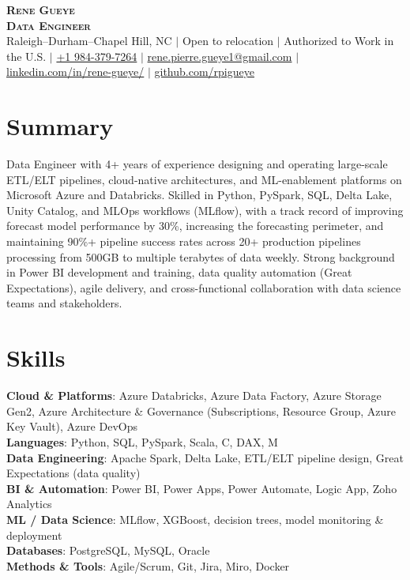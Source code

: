 \documentclass[letterpaper,11pt]{article}
\begin{document}
\begin{center}
    \textbf{\Huge \scshape Rene Gueye} \\ \vspace{3pt}
    \textbf{ \Large \scshape Data Engineer} \\ \vspace{3pt}
    \small
    Raleigh--Durham--Chapel Hill, NC $|$ Open to relocation $|$ Authorized to Work in the U.S. $|$
    \href{tel:+19843797264}{+1 984-379-7264} $|$
    \href{mailto:rene.pierre.gueye1@gmail.com}{rene.pierre.gueye1@gmail.com} $|$
    \href{https://linkedin.com/in/rene-gueye/}{linkedin.com/in/rene-gueye/} $|$
    \href{https://github.com/rpigueye}{github.com/rpigueye}
\end{center}

\section{Summary}
\small{Data Engineer with 4+ years of experience designing and operating large-scale ETL/ELT pipelines, cloud-native architectures, and ML-enablement platforms on Microsoft Azure and Databricks. Skilled in Python, PySpark, SQL, Delta Lake, Unity Catalog, and MLOps workflows (MLflow), with a track record of improving forecast model performance by 30\%, increasing the forecasting perimeter, and maintaining 90\%+ pipeline success rates across 20+ production pipelines processing from 500GB to multiple terabytes of data weekly. Strong background in Power BI development and training, data quality automation (Great Expectations), agile delivery, and cross-functional collaboration with data science teams and stakeholders.}

\section{Skills}
 \begin{itemize}[leftmargin=0.15in, label={}]
    \small{\item{
     \textbf{Cloud \& Platforms}{: Azure Databricks, Azure Data Factory, Azure Storage Gen2, Azure Architecture \& Governance (Subscriptions, Resource Group, Azure Key Vault), Azure DevOps} \\
     \textbf{Languages}{: Python, SQL, PySpark, Scala, C, DAX, M} \\
     \textbf{Data Engineering}{: Apache Spark, Delta Lake, ETL/ELT pipeline design, Great Expectations (data quality)} \\
     \textbf{BI \& Automation}{: Power BI, Power Apps, Power Automate, Logic App, Zoho Analytics} \\
     \textbf{ML / Data Science}{: MLflow, XGBoost, decision trees, model monitoring \& deployment} \\
     \textbf{Databases}{: PostgreSQL, MySQL, Oracle} \\
     \textbf{Methods \& Tools}{: Agile/Scrum, Git, Jira, Miro, Docker}
    }}
 \end{itemize}
\end{document}
